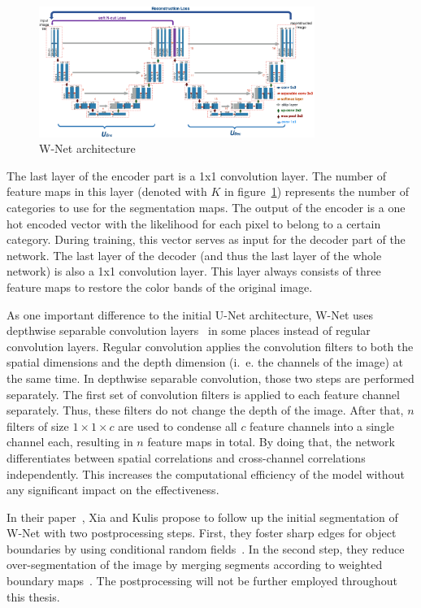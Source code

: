 \begin{figure}[h]
    \centering
    \includegraphics[width=0.8\textwidth]{images/w-net-architecture}
    \caption{W-Net architecture~\cite{wnet17}}
    \label{fig:wnet_architecture}
\end{figure}

The last layer of the encoder part is a 1x1 convolution layer. The number of feature maps in this layer (denoted with $K$ in figure~\ref{fig:wnet_architecture}) represents the number of categories to use for the segmentation maps. The output of the encoder is a one hot encoded vector with the likelihood for each pixel to belong to a certain category. During training, this vector serves as input for the decoder part of the network. The last layer of the decoder (and thus the last layer of the whole network) is also a 1x1 convolution layer. This layer always consists of three feature maps to restore the color bands of the original image.

As one important difference to the initial U-Net architecture, W-Net uses depthwise separable convolution layers~\cite{depthwise_conv17} in some places instead of regular convolution layers. Regular convolution applies the convolution filters to both the spatial dimensions and the depth dimension (i.~e. the channels of the image) at the same time. In depthwise separable convolution, those two steps are performed separately. The first set of convolution filters is applied to each feature channel separately. Thus, these filters do not change the depth of the image. After that, $n$ filters of size $1\times 1\times c$ are used to condense all $c$ feature channels into a single channel each, resulting in $n$ feature maps in total. By doing that, the network differentiates between spatial correlations and cross-channel correlations independently. This increases the computational efficiency of the model without any significant impact on the effectiveness.

In their paper~\cite{wnet17}, Xia and Kulis propose to follow up the initial segmentation of W-Net with two postprocessing steps. First, they foster sharp edges for object boundaries by using conditional random fields~\cite{crf17}. In the second step, they reduce over-segmentation of the image by merging segments according to weighted boundary maps~\cite{hierarchy_imgseg11}. The postprocessing will not be further employed throughout this thesis.


